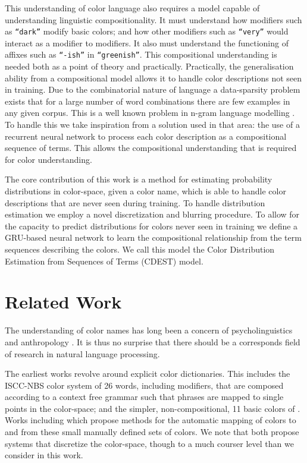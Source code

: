 \documentclass[11pt,a4paper]{article}
\newcommand{\parencite}{\citep}
\newcommand{\textcite}{\cite}
\begin{document}
This understanding of color language also requires a model capable of understanding linguistic compositionality.
It must understand how modifiers such as \texttt{``dark''} modify basic colors; and  how other modifiers such as \texttt{``very''} would interact as a modifier to modifiers.
It also must understand the functioning of affixes such as \texttt{``-ish''} in \texttt{``greenish''}.
This compositional understanding is needed both as a point of theory and practically.
Practically, the generalisation ability from a compositional model allows it to handle color descriptions not seen in training.
Due to the combinatorial nature of language a data-sparsity problem exists that
for a large number of word combinations there are few examples in any given corpus.
This is a well known problem in n-gram language modelling \parencite{kneser1995improved,chen1996empirical,rosenfeld2000two}.
To handle this we take inspiration from a solution used in that area: the use of a recurrent neural network \parencite{mikolov2010recurrent,mikolov2011RnnLM} to process each color description as a compositional sequence of terms.
This allows the compositional understanding that is required for color understanding.


The core contribution of this work is a method for estimating probability distributions in color-space, given a color name,
 which is able to handle color descriptions that are never seen during training.
To handle distribution estimation we employ a novel discretization and blurring procedure.
To allow for the capacity to predict distributions for colors never seen in training we define a GRU-based neural network to learn the compositional relationship from the term sequences describing the colors.
We call this model the Color Distribution Estimation from Sequences of Terms (CDEST) model.


\section{Related Work}\label{sec:related-work}
The understanding of color names has long been a concern of psycholinguistics and anthropology  \parencite{berlin1969basic,heider1972universals,HEIDER1972337,mylonas2015use}.
It is thus no surprise that there should be a corresponds field of research in natural language processing.

The earliest works revolve around explicit color dictionaries.
This includes the ISCC-NBS color system \parencite{kelly1955iscc} of 26 words, including modifiers, that are composed according to a context free grammar such that phrases are mapped to single points in the color-space;
and the simpler, non-compositional, 11 basic colors of \textcite{berlin1969basic}.
Works including \textcite{Berk:1982:HFS:358589.358606,conway1992experimental, mojsilovic2005computational, ele1994computational, menegaz2007discrete,van2009learning} which propose methods for the automatic mapping of colors to and from these small manually defined sets of colors.
We note that \textcite{menegaz2007discrete,van2009learning} both propose systems that discretize the color-space, though to a much courser level than we consider in this work.
\end{document}
